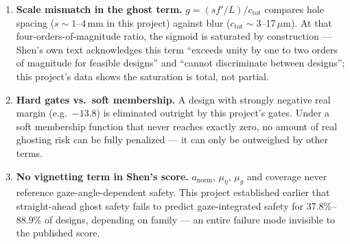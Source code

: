 \begin{enumerate}
  \item \textbf{Scale mismatch in the ghost term.} $g=(sf'/L)/c_{\text{tot}}$
  compares hole spacing ($s\sim1$--4\,mm in this project) against blur
  ($c_{\text{tot}}\sim3$--17\,$\mu$m). At that four-orders-of-magnitude
  ratio, the sigmoid is saturated by construction --- Shen's own text
  acknowledges this term ``exceeds unity by one to two orders of magnitude
  for feasible designs'' and ``cannot discriminate between designs''; this
  project's data shows the saturation is total, not partial.
  \item \textbf{Hard gates vs.\ soft membership.} A design with strongly
  negative real margin (e.g.\ $-13.8$) is eliminated outright by this
  project's gates. Under a soft membership function that never reaches
  exactly zero, no amount of real ghosting risk can be fully penalized ---
  it can only be outweighed by other terms.
  \item \textbf{No vignetting term in Shen's score.} $a_{\text{norm}}$,
  $\mu_\eta$, $\mu_g$ and coverage never reference gaze-angle-dependent
  safety. This project established earlier that straight-ahead ghost
  safety fails to predict gaze-integrated safety for 37.8\%--88.9\% of
  designs, depending on family --- an entire failure mode invisible to the
  published score.
\end{enumerate}

\newpage
